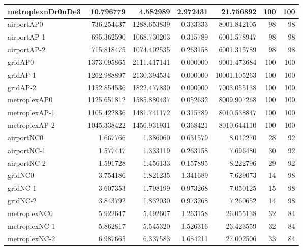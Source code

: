 \begin{longtable}{|l|r|r|r|r|r|r|}
metroplexnDr0nDe3 & 10.796779 & 4.582989 & 2.972431 & 21.756892 & 100 & 100 \\ \hline
airportAP0 & 736.254437 & 1288.653839 & 0.333333 & 8001.842105 & 98 & 98 \\ \hline
airportAP-1 & 695.362590 & 1068.730203 & 0.315789 & 6001.578947 & 98 & 98 \\ \hline
airportAP-2 & 715.818475 & 1074.402535 & 0.263158 & 6001.315789 & 98 & 98 \\ \hline
gridAP0 & 1373.095865 & 2111.417141 & 0.000000 & 9001.473684 & 100 & 100 \\ \hline
gridAP-1 & 1262.988897 & 2130.394534 & 0.000000 & 10001.105263 & 100 & 100 \\ \hline
gridAP-2 & 1152.854536 & 1822.477830 & 0.000000 & 7003.055138 & 100 & 100 \\ \hline
metroplexAP0 & 1125.651812 & 1585.880437 & 0.052632 & 8009.907268 & 100 & 100 \\ \hline
metroplexAP-1 & 1105.422836 & 1481.741172 & 0.315789 & 8010.538847 & 100 & 100 \\ \hline
metroplexAP-2 & 1045.338422 & 1456.931931 & 0.368421 & 8010.644110 & 100 & 100 \\ \hline
airportNC0 & 1.667766 & 1.386060 & 0.631579 & 8.012270 & 28 & 92 \\ \hline
airportNC-1 & 1.577447 & 1.333119 & 0.263158 & 7.696480 & 30 & 92 \\ \hline
airportNC-2 & 1.591728 & 1.456133 & 0.157895 & 8.222796 & 29 & 92 \\ \hline
gridNC0 & 3.754186 & 1.821235 & 1.341689 & 7.629073 & 14 & 98 \\ \hline
gridNC-1 & 3.607353 & 1.798199 & 0.973268 & 7.050125 & 15 & 98 \\ \hline
gridNC-2 & 3.843792 & 1.832030 & 0.973268 & 7.260652 & 14 & 98 \\ \hline
metroplexNC0 & 5.922647 & 5.492607 & 1.263158 & 26.055138 & 32 & 84 \\ \hline
metroplexNC-1 & 5.862817 & 5.545320 & 1.526316 & 26.423559 & 32 & 84 \\ \hline
metroplexNC-2 & 6.987665 & 6.337583 & 1.684211 & 27.002506 & 33 & 84 \\ \hline
\end{longtable}
